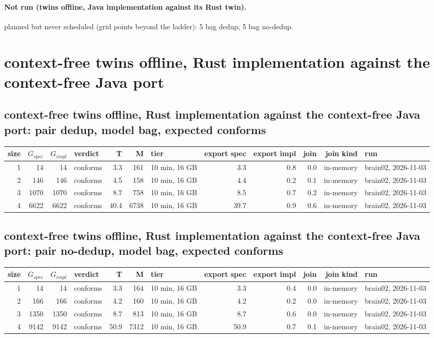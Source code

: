 \documentclass[10pt]{article}
\begin{document}
\paragraph{Not run (twins offline, Java implementation against its Rust twin).}
planned but never scheduled (grid points beyond the ladder): 5 bag dedup, 5 bag no-dedup.\par
\section*{context-free twins offline, Rust implementation against the context-free Java port}
\subsection*{context-free twins offline, Rust implementation against the context-free Java port: pair \textsf{dedup}, model bag, expected conforms}
\begin{longtable}{@{}rrrlrrlrrrrl@{}}
\toprule
size & $G_{\mathit{spec}}$ & $G_{\mathit{impl}}$ & verdict & T & M & tier & export spec & export impl & join & join kind & run \\
\midrule
\endhead
\color{red} 1 & 14 & 14 & conforms & 3.3 & 161 & 10 min, 16 GB & 3.3 & 0.8 & 0.0 & in-memory & brain02, 2026-11-03 \\
\color{red} 2 & 146 & 146 & conforms & 4.5 & 158 & 10 min, 16 GB & 4.4 & 0.2 & 0.1 & in-memory & brain02, 2026-11-03 \\
\color{red} 3 & 1070 & 1070 & conforms & 8.7 & 758 & 10 min, 16 GB & 8.5 & 0.7 & 0.2 & in-memory & brain02, 2026-11-03 \\
\color{red} 4 & 6622 & 6622 & conforms & 40.4 & 6738 & 10 min, 16 GB & 39.7 & 0.9 & 0.6 & in-memory & brain02, 2026-11-03 \\
\bottomrule
\end{longtable}
\subsection*{context-free twins offline, Rust implementation against the context-free Java port: pair \textsf{no-dedup}, model bag, expected conforms}
\begin{longtable}{@{}rrrlrrlrrrrl@{}}
\toprule
size & $G_{\mathit{spec}}$ & $G_{\mathit{impl}}$ & verdict & T & M & tier & export spec & export impl & join & join kind & run \\
\midrule
\endhead
\color{red} 1 & 14 & 14 & conforms & 3.3 & 164 & 10 min, 16 GB & 3.3 & 0.4 & 0.0 & in-memory & brain02, 2026-11-03 \\
\color{red} 2 & 166 & 166 & conforms & 4.2 & 160 & 10 min, 16 GB & 4.2 & 0.2 & 0.0 & in-memory & brain02, 2026-11-03 \\
\color{red} 3 & 1350 & 1350 & conforms & 8.7 & 813 & 10 min, 16 GB & 8.7 & 0.6 & 0.0 & in-memory & brain02, 2026-11-03 \\
\color{red} 4 & 9142 & 9142 & conforms & 50.9 & 7312 & 10 min, 16 GB & 50.9 & 0.7 & 0.1 & in-memory & brain02, 2026-11-03 \\
\bottomrule
\end{longtable}
\end{document}
